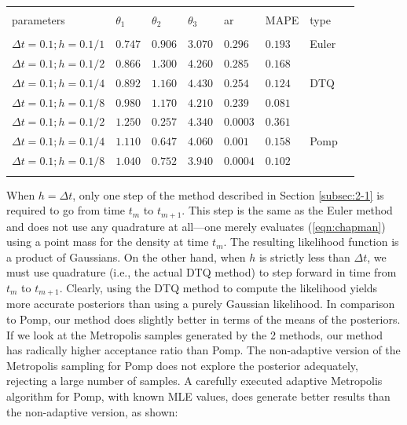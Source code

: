 \documentclass[graybox]{svmult}
\begin{document}
\setlength{\tabcolsep}{10pt}
\begin{table}[] \centering 
\begin{tabular}{llllllll} 
\\[-1.8ex]\hline 
\hline \\[-1.8ex] 
parameters & $\theta_1$ & $\theta_2$ & $\theta_3$ & ar & MAPE & type \\ 
\hline \\[-1.8ex] 
$\Delta t = 0.1; h = 0.1/1$ & $0.747$ & $0.906$ & $3.070$ & $0.296$ & $0.193$ & Euler \\ \hline
$\Delta t = 0.1; h = 0.1/2$ & $0.866$ & $1.300$ & $4.260$ & $0.285$ & $0.168$ &  \\ 
$\Delta t = 0.1; h = 0.1/4$ & $0.892$ & $1.160$ & $4.430$ & $0.254$ & $0.124$ & DTQ \\ 
$\Delta t = 0.1; h = 0.1/8$ & $0.980$ & $1.170$ & $4.210$ & $0.239$ & $0.081$ &  \\ \hline
$\Delta t = 0.1; h = 0.1/2$ & $1.250$ & $0.257$ & $4.340$ & $0.0003$ & $0.361$ &  \\ 
$\Delta t = 0.1; h = 0.1/4$ & $1.110$ & $0.647$ & $4.060$ & $0.001$ & $0.158$ & Pomp \\ 
$\Delta t = 0.1; h = 0.1/8$ & $1.040$ & $0.752$ & $3.940$ & $0.0004$ & $0.102$ &  \\ 
\hline \\[-1.8ex] 
\end{tabular} 
\end{table} 
\vspace{-5mm}
When $h = \Delta t$, only one step of the method described in Section
\ref{subsec:2-1} is required to go from time $t_m$ to $t_{m+1}$. This
step is the same as the Euler method and does not use any quadrature at all---one merely evaluates (\ref{eqn:chapman}) using a point mass for the density at time $t_m$. The resulting likelihood function is a product of Gaussians. On the other hand, when $h$ is strictly less than $\Delta t$, we must use quadrature (i.e., the actual DTQ method) to step forward in time from $t_m$ to $t_{m+1}$. Clearly, using the DTQ method to compute the likelihood yields more accurate posteriors than using a purely Gaussian likelihood. In comparison to Pomp, our method does slightly better in terms of the means of the posteriors. If we look at the Metropolis samples generated by the 2 methods, our method has radically higher acceptance ratio than Pomp. The non-adaptive version of the Metropolis sampling for Pomp does not explore the posterior adequately, rejecting a large number of samples. A carefully executed adaptive Metropolis algorithm for Pomp, with known MLE values, does generate better results than the non-adaptive version, as shown:
\end{document}
